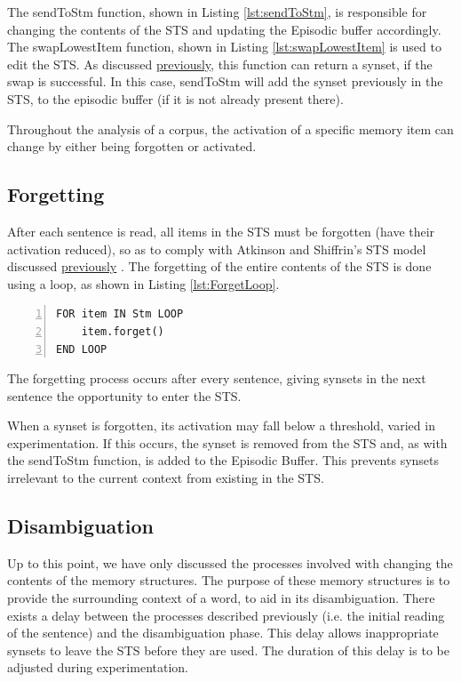 \documentclass[]{article}
\begin{document}
The sendToStm function, shown in Listing \ref{lst:sendToStm}, is responsible for changing the contents of the STS and updating the Episodic buffer accordingly. The swapLowestItem function, shown in Listing \ref{lst:swapLowestItem} is used to edit the STS. As discussed \hyperref[sec:ImplementedSTS]{previously}, this function can return a synset, if the swap is successful. In this case, sendToStm will add the synset previously in the STS, to the episodic buffer (if it is not already present there).

Throughout the analysis of a corpus, the activation of a specific memory item can change by either being forgotten or activated.

\subsection{Forgetting}
\label{sec:forgetting}
After each sentence is read, all items in the STS must be forgotten (have their activation reduced), so as to comply with Atkinson and Shiffrin's STS model discussed \hyperref[ShortTerm]{previously} \cite{ControlProcessesSTMAtkinson}. The forgetting of the entire contents of the STS is done using a loop, as shown in Listing \ref{lst:ForgetLoop}.

\begin{lstlisting}[numbers=left, numberstyle=\small, caption={Forget loop}, captionpos=b, label={lst:ForgetLoop}]
FOR item IN Stm LOOP
	item.forget()
END LOOP
\end{lstlisting}

The forgetting process occurs after every sentence, giving synsets in the next sentence the opportunity to enter the STS.

When a synset is forgotten, its activation may fall below a threshold, varied in experimentation. If this occurs, the synset is removed from the STS and, as with the sendToStm function, is added to the Episodic Buffer. This prevents synsets irrelevant to the current context from existing in the STS.

\subsection{Disambiguation}
\label{sec:ImplementedDisambiguation}
Up to this point, we have only discussed the processes involved with changing the contents of the memory structures. The purpose of these memory structures is to provide the surrounding context of a word, to aid in its disambiguation. There exists a delay between the processes described previously (i.e. the initial reading of the sentence) and the disambiguation phase. This delay allows inappropriate synsets to leave the STS before they are used. The duration of this delay is to be adjusted during experimentation.
\end{document}
